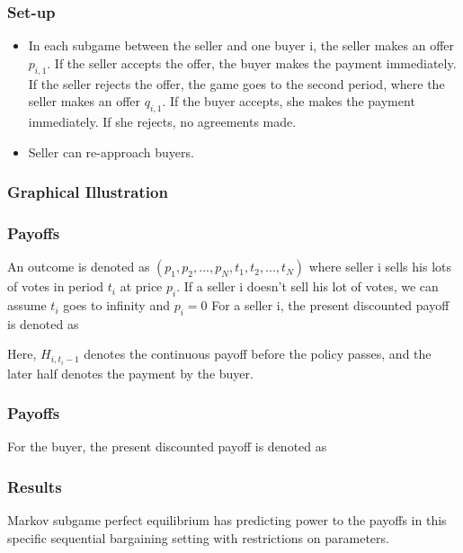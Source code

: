 \documentclass[pdflatex]{beamer}
\begin{document}
\begin{frame}
	\frametitle{Set-up}
	\begin{itemize}
		\item In each subgame between the seller and one buyer i, the seller makes an offer $p_{i,1}$. If the seller accepts the offer, the buyer makes the payment immediately. If the seller rejects the offer, the game goes to the second period, where the seller makes an offer $q_{i, 1}$. If the buyer accepts, she makes the payment immediately. If she rejects, no agreements made.
		\item Seller can re-approach buyers.
	\end{itemize}
\end{frame}

\begin{frame}[shrink = 20]
	\frametitle{Graphical Illustration}
	\providecommand{\figName}{Xiao2seller}
	\providecommand{\figFile}{\figName}
	
\end{frame}


\begin{frame}
	\frametitle{Payoffs}
	An outcome is denoted as $(p_1, p_2, ..., p_N, t_1, t_2, ..., t_N)$ where seller i sells his lots of votes in period $t_i$ at price $p_i$. If a seller i doesn't sell his lot of votes, we can assume $t_i$ goes to infinity and $p_i= 0$  For a seller i, the present discounted payoff is denoted as
	
	
	
	Here, $H_{i, t_i-1}$ denotes the continuous payoff before the policy passes, and the later half denotes the payment by the buyer.
\end{frame}
\begin{frame}
	\frametitle{Payoffs}
	For the buyer, the present discounted payoff is denoted as 
	
	
\end{frame}

\begin{frame}
	\frametitle{Results}
	Markov subgame perfect equilibrium has predicting power to the payoffs in this specific sequential bargaining setting with restrictions on parameters.
\end{frame}
\end{document}
